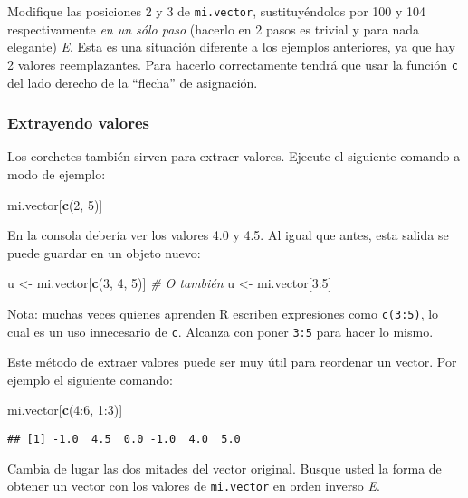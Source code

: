 \documentclass[]{article}
\newenvironment{Shaded}{}{}
\newcommand{\KeywordTok}[1]{\textcolor[rgb]{0.00,0.44,0.13}{\textbf{{#1}}}}
\newcommand{\DecValTok}[1]{\textcolor[rgb]{0.25,0.63,0.44}{{#1}}}
\newcommand{\CommentTok}[1]{\textcolor[rgb]{0.38,0.63,0.69}{\textit{{#1}}}}
\newcommand{\NormalTok}[1]{{#1}}
\begin{document}
Modifique las posiciones 2 y 3 de \texttt{mi.vector}, sustituyéndolos
por 100 y 104 respectivamente \emph{en un sólo paso} (hacerlo en 2 pasos
es trivial y para nada elegante) \emph{E}. Esta es una situación
diferente a los ejemplos anteriores, ya que hay 2 valores reemplazantes.
Para hacerlo correctamente tendrá que usar la función \texttt{c} del
lado derecho de la ``flecha'' de asignación.

\subsubsection{Extrayendo valores}

Los corchetes también sirven para extraer valores. Ejecute el siguiente
comando a modo de ejemplo:

\begin{Shaded}
\begin{Highlighting}[]
\NormalTok{mi.vector[}\KeywordTok{c}\NormalTok{(}\DecValTok{2}\NormalTok{, }\DecValTok{5}\NormalTok{)]}
\end{Highlighting}
\end{Shaded}
En la consola debería ver los valores 4.0 y 4.5. Al igual que antes,
esta salida se puede guardar en un objeto nuevo:

\begin{Shaded}
\begin{Highlighting}[]
\NormalTok{u <- mi.vector[}\KeywordTok{c}\NormalTok{(}\DecValTok{3}\NormalTok{, }\DecValTok{4}\NormalTok{, }\DecValTok{5}\NormalTok{)]}
\CommentTok{# O también}
\NormalTok{u <- mi.vector[}\DecValTok{3}\NormalTok{:}\DecValTok{5}\NormalTok{]}
\end{Highlighting}
\end{Shaded}
Nota: muchas veces quienes aprenden R escriben expresiones como
\texttt{c(3:5)}, lo cual es un uso innecesario de \texttt{c}. Alcanza
con poner \texttt{3:5} para hacer lo mismo.

Este método de extraer valores puede ser muy útil para reordenar un
vector. Por ejemplo el siguiente comando:

\begin{Shaded}
\begin{Highlighting}[]
\NormalTok{mi.vector[}\KeywordTok{c}\NormalTok{(}\DecValTok{4}\NormalTok{:}\DecValTok{6}\NormalTok{, }\DecValTok{1}\NormalTok{:}\DecValTok{3}\NormalTok{)]}
\end{Highlighting}
\end{Shaded}
\begin{verbatim}
## [1] -1.0  4.5  0.0 -1.0  4.0  5.0
\end{verbatim}
Cambia de lugar las dos mitades del vector original. Busque usted la
forma de obtener un vector con los valores de \texttt{mi.vector} en
orden inverso \emph{E}.
\end{document}
